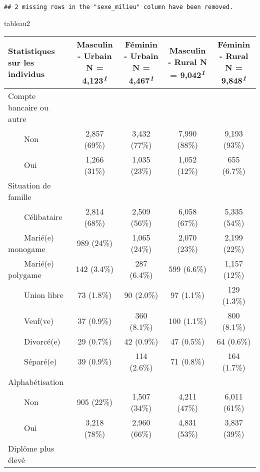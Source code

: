 \documentclass[
]{article}
\newenvironment{Shaded}{\begin{snugshade}}{\end{snugshade}}
\newcommand{\NormalTok}[1]{#1}
\begin{document}
\begin{verbatim}
## 2 missing rows in the "sexe_milieu" column have been removed.
\end{verbatim}

\begin{Shaded}
\begin{Highlighting}[]
\NormalTok{tableau2}
\end{Highlighting}
\end{Shaded}

\begin{table}[!t]
\fontsize{12.0pt}{14.4pt}\selectfont
\begin{tabular*}{\linewidth}{@{\extracolsep{\fill}}lcccc}
\toprule
Statistiques sur les individus & \textbf{Masculin - Urbain}  N = 4,123\textsuperscript{\textit{1}} & \textbf{Féminin - Urbain}  N = 4,467\textsuperscript{\textit{1}} & \textbf{Masculin - Rural}  N = 9,042\textsuperscript{\textit{1}} & \textbf{Féminin - Rural}  N = 9,848\textsuperscript{\textit{1}} \\ 
\midrule\addlinespace[2.5pt]
Compte bancaire ou autre &  &  &  &  \\ 
    Non & 2,857 (69\%) & 3,432 (77\%) & 7,990 (88\%) & 9,193 (93\%) \\ 
    Oui & 1,266 (31\%) & 1,035 (23\%) & 1,052 (12\%) & 655 (6.7\%) \\ 
Situation de famille &  &  &  &  \\ 
    Célibataire & 2,814 (68\%) & 2,509 (56\%) & 6,058 (67\%) & 5,335 (54\%) \\ 
    Marié(e) monogame & 989 (24\%) & 1,065 (24\%) & 2,070 (23\%) & 2,199 (22\%) \\ 
    Marié(e) polygame & 142 (3.4\%) & 287 (6.4\%) & 599 (6.6\%) & 1,157 (12\%) \\ 
    Union libre & 73 (1.8\%) & 90 (2.0\%) & 97 (1.1\%) & 129 (1.3\%) \\ 
    Veuf(ve) & 37 (0.9\%) & 360 (8.1\%) & 100 (1.1\%) & 800 (8.1\%) \\ 
    Divorcé(e) & 29 (0.7\%) & 42 (0.9\%) & 47 (0.5\%) & 64 (0.6\%) \\ 
    Séparé(e) & 39 (0.9\%) & 114 (2.6\%) & 71 (0.8\%) & 164 (1.7\%) \\ 
Alphabétisation &  &  &  &  \\ 
    Non & 905 (22\%) & 1,507 (34\%) & 4,211 (47\%) & 6,011 (61\%) \\ 
    Oui & 3,218 (78\%) & 2,960 (66\%) & 4,831 (53\%) & 3,837 (39\%) \\ 
Diplôme plus élevé &  &  &  &  \\ 

\end{tabular*}
\end{table}
\end{document}
